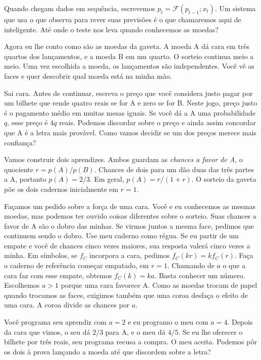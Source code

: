 Quando chegam dados em sequência, escrevemos $p_t=\mathcal F(p_{t-1};x_t)$. Um sistema que usa o que observa para rever suas previsões é o que chamaremos aqui de inteligente. Até onde o teste nos leva quando conhecemos as moedas?

Agora eu lhe conto como são as moedas da gaveta. A moeda A dá cara em três quartos dos lançamentos, e a moeda B em um quarto. O sorteio continua meio a meio. Uma vez escolhida a moeda, os lançamentos são independentes. Você vê as faces e quer descobrir qual moeda está na minha mão.

Sai cara. Antes de continuar, escreva o preço que você considera justo pagar por um bilhete que rende quatro reais se for A e zero se for B. Neste jogo, preço justo é o pagamento médio em muitas mesas iguais. Se você dá a A uma probabilidade \(q\), esse preço é \(4q\) reais. Podemos discordar sobre o preço e ainda assim concordar que A é a letra mais provável. Como vamos decidir se um dos preços merece mais confiança?

Vamos construir dois aprendizes. Ambos guardam as \emph{chances a favor de A}, o quociente \(r=p(A)/p(B)\). Chances de dois para um dão duas das três partes a A, portanto \(p(A)=2/3\). Em geral, \(p(A)=r/(1+r)\). O sorteio da gaveta põe os dois cadernos inicialmente em \(r=1\).

Façamos um pedido sobre a força de uma cara. Você e eu conhecemos as mesmas moedas, mas podemos ter ouvido coisas diferentes sobre o sorteio. Suas chances a favor de A são o dobro das minhas. Se virmos juntos a mesma face, pedimos que continuem sendo o dobro. Use meu caderno como régua. Se eu partir de um empate e você de chances cinco vezes maiores, sua resposta valerá cinco vezes a minha. Em símbolos, se $f_C$ incorpora a cara, pedimos $f_C(kr)=kf_C(r)$. Faça o caderno de referência começar empatado, em $r=1$. Chamando de $a$ o que a cara faz com esse empate, obtemos $f_C(k)=ka$. Basta conhecer um número. Escolhemos \(a>1\) porque uma cara favorece A. Como as moedas trocam de papel quando trocamos as faces, exigimos também que uma coroa desfaça o efeito de uma cara. A coroa divide as chances por \(a\).

Você programa seu aprendiz com \(a=2\) e eu programo o meu com \(a=4\). Depois da cara que vimos, o seu dá \(2/3\) para A, e o meu dá \(4/5\). Se eu lhe oferecer o bilhete por três reais, seu programa recusa a compra. O meu aceita. Podemos pôr os dois à prova lançando a moeda até que discordem sobre a letra?

